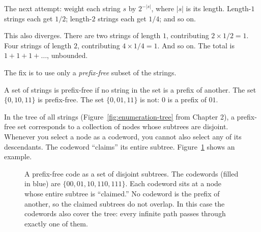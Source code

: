 The next attempt: weight each string $s$ by $2^{-|s|}$, where $|s|$ is its length. Length-$1$ strings each get $1/2$; length-$2$ strings each get $1/4$; and so on.

This also diverges. There are two strings of length $1$, contributing $2 \times 1/2 = 1$. Four strings of length $2$, contributing $4 \times 1/4 = 1$. And so on. The total is $1 + 1 + 1 + \dots$, unbounded.

The fix is to use only a \emph{prefix-free} subset of the strings.

A set of strings is prefix-free if no string in the set is a prefix of another. The set $\{0, 10, 11\}$ is prefix-free. The set $\{0, 01, 11\}$ is not: $0$ is a prefix of $01$.

In the tree of all strings (Figure~\ref{fig:enumeration-tree} from Chapter 2), a prefix-free set corresponds to a collection of nodes whose subtrees are disjoint. Whenever you select a node as a codeword, you cannot also select any of its descendants. The codeword ``claims'' its entire subtree. Figure~\ref{fig:prefix-free-tree} shows an example.

\begin{figure}[h]
\centering
{}
\caption{A prefix-free code as a set of disjoint subtrees. The codewords (filled in blue) are $\{00, 01, 10, 110, 111\}$. Each codeword sits at a node whose entire subtree is ``claimed.'' No codeword is the prefix of another, so the claimed subtrees do not overlap. In this case the codewords also cover the tree: every infinite path passes through exactly one of them.}
\label{fig:prefix-free-tree}
\end{figure}

